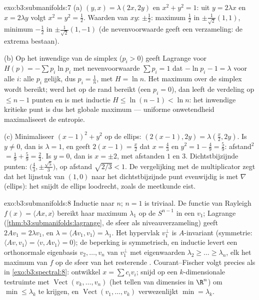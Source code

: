 \begin{solution}{exo:b3:submanifolds:7}
(a) $(y, x) = \lambda(2x, 2y)$ en $x^2 + y^2 = 1$: uit $y =
2\lambda x$ en $x = 2\lambda y$ volgt $x^2 = y^2 = \frac12$.
Waarden van $xy$: $\pm\frac12$: maximum $\frac12$ in
$\pm\frac1{\sqrt2}(1,1)$, minimum $-\frac12$ in
$\pm\frac1{\sqrt2}(1,-1)$ (de nevenvoorwaarde geeft een 
verzameling: de extrema bestaan).

(b) Op het inwendige van de simplex ($p_i > 0$) geeft Lagrange
voor $H(p) = -\sum p_i\ln p_i$ met nevenvoorwaarde $\sum p_i = 1$
dat $-\ln p_i - 1 = \lambda$ voor alle $i$: alle $p_i$ gelijk,
dus $p_i = \frac1n$, met $H = \ln n$. Het maximum over de
 simplex wordt bereikt; werd het op de rand bereikt (een
$p_i = 0$), dan leeft de verdeling op $\leq n - 1$ punten en is
met inductie $H \leq \ln(n-1) < \ln n$: het inwendige kritieke
punt is dus het globale maximum --- uniforme onwetendheid
maximaliseert de entropie.

(c) Minimaliseer $(x-1)^2 + y^2$ op de  ellips:
$(2(x{-}1), 2y) = \lambda(\frac x2, 2y)$. Is $y \neq 0$, dan is
$\lambda = 1$, en geeft $2(x - 1) = \frac x2$ dat $x = \frac43$
en $y^2 = 1 - \frac49 = \frac59$: afstand$^2$ $= \frac19 +
\frac59 = \frac23$. Is $y = 0$, dan is $x = \pm2$, met afstanden
$1$ en $3$. Dichtstbijzijnde punten: $\bigl(\frac43,
\pm\frac{\sqrt5}3\bigr)$, op afstand $\sqrt{2/3} < 1$. De
vergelijking met de multiplicator zegt dat het lijnstuk van
$(1,0)$ naar het dichtstbijzijnde punt evenwijdig is met
$\nabla$(ellips): het snijdt de ellips loodrecht, zoals de
meetkunde eist.
\end{solution}

\begin{solution}{exo:b3:submanifolds:8}
Inductie naar $n$; $n = 1$ is triviaal. De functie van Rayleigh
$f(x) = \langle Ax, x\rangle$ bereikt haar maximum $\lambda_1$ op
de  $S^{n-1}$ in een $v_1$; Lagrange
(\cref{thm:b3:submanifolds:lagrange}, de sfeer als
niveauverzameling) geeft $2Av_1 = 2\lambda v_1$, en $\lambda =
\langle Av_1, v_1\rangle = \lambda_1$. Het hypervlak $v_1^\perp$
is $A$-invariant (symmetrie: $\langle Av, v_1\rangle = \langle v,
Av_1\rangle = 0$); de beperking is symmetrisch, en inductie
levert een orthonormale eigenbasis $v_2, \dots, v_n$ van
$v_1^\perp$ met eigenwaarden $\lambda_2 \geq \dots \geq
\lambda_n$, elk het maximum van $f$ op de sfeer van het
resterende . Courant--Fischer volgt precies
als in \cref{exo:b3:spectral:8}: ontwikkel $x = \sum c_iv_i$;
snijd op een $k$-dimensionale testruimte met
$\operatorname{Vect}(v_k, \dots, v_n)$ (het tellen van dimensies
in $\R^n$) om $\min \leq \lambda_k$ te krijgen, en
$\operatorname{Vect}(v_1, \dots, v_k)$ verwezenlijkt $\min =
\lambda_k$.
\end{solution}

